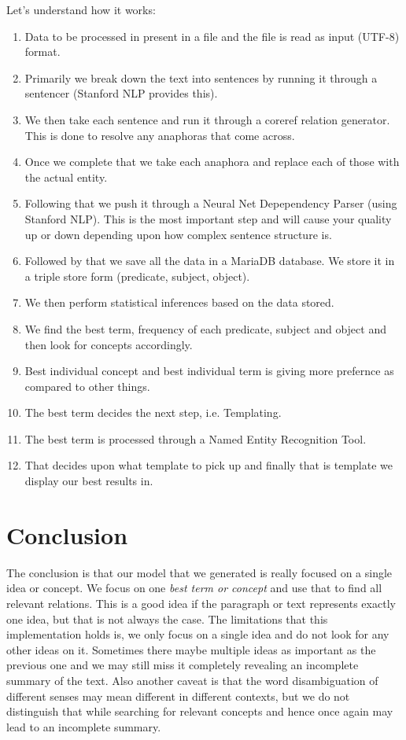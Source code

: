 \documentclass[conference]{IEEEtran}
\begin{document}
Let's understand how it works:
\begin{enumerate}
\item Data to be processed in present in a file and the file is read as input (UTF-8) format.
\item Primarily we break down the text into sentences by running it through a sentencer (Stanford NLP provides this).
\item We then take each sentence and run it through a coreref relation generator. This is done to resolve any anaphoras that come across.
\item Once we complete that we take each anaphora and replace each of those with the actual entity.
\item Following that we push it through a Neural Net Depependency Parser (using Stanford NLP). This is the most important step and will cause your quality up or down depending upon how complex sentence structure is.
\item Followed by that we save all the data in a MariaDB database. We store it in a triple store form (predicate, subject, object).
\item We then perform statistical inferences based on the data stored.
\item We find the best term, frequency of each predicate, subject and object and then look for concepts accordingly.
\item Best individual concept and best individual term is giving more prefernce as compared to other things.
\item The best term decides the next step, i.e. Templating.
\item The best term is processed through a Named Entity Recognition Tool.
\item That decides upon what template to pick up and finally that is template we display our best results in.
\end{enumerate}

\section{Conclusion}
The conclusion is that our model that we generated is really focused on a single idea or concept. We focus on one \textit{best term or concept} and use that to find all relevant relations. This is a good idea if the paragraph or text represents exactly one idea, but that is not always the case. The limitations that this implementation holds is, we only focus on a single idea and do not look for any other ideas on it. Sometimes there maybe multiple ideas as important as the previous one and we may still miss it completely revealing an incomplete summary of the text. Also another caveat is that the word disambiguation of different senses may mean different in different contexts, but we do not distinguish that while searching for relevant concepts and hence once again may lead to an incomplete summary.
\end{document}
